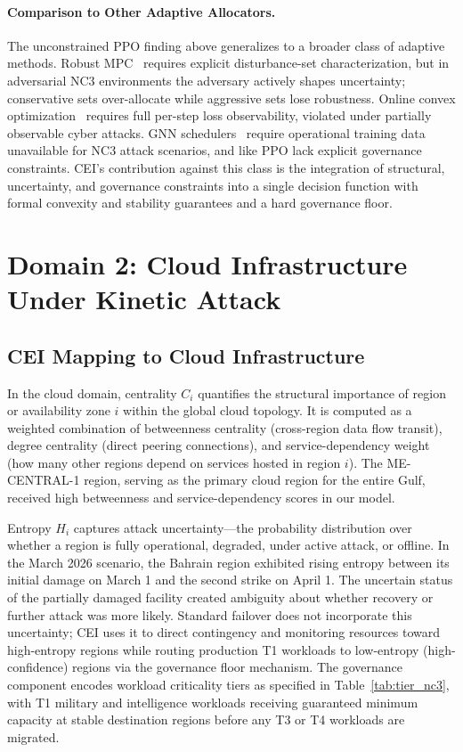 \documentclass[runningheads]{llncs}
\begin{document}
\paragraph{Comparison to Other Adaptive Allocators.} The unconstrained PPO finding above generalizes to a broader class of adaptive methods. Robust MPC~\cite{mayne} requires explicit disturbance-set characterization, but in adversarial NC3 environments the adversary actively shapes uncertainty; conservative sets over-allocate while aggressive sets lose robustness. Online convex optimization~\cite{hazan} requires full per-step loss observability, violated under partially observable cyber attacks. GNN schedulers~\cite{deng} require operational training data unavailable for NC3 attack scenarios, and like PPO lack explicit governance constraints. CEI's contribution against this class is the integration of structural, uncertainty, and governance constraints into a single decision function with formal convexity and stability guarantees and a hard governance floor.

\section{Domain 2: Cloud Infrastructure Under Kinetic Attack}
\label{sec:cloud}

\subsection{CEI Mapping to Cloud Infrastructure}

In the cloud domain, centrality $C_i$ quantifies the structural importance of region or availability zone $i$ within the global cloud topology. It is computed as a weighted combination of betweenness centrality (cross-region data flow transit), degree centrality (direct peering connections), and service-dependency weight (how many other regions depend on services hosted in region $i$). The ME-CENTRAL-1 region, serving as the primary cloud region for the entire Gulf, received high betweenness and service-dependency scores in our model.

Entropy $H_i$ captures attack uncertainty---the probability distribution over whether a region is fully operational, degraded, under active attack, or offline. In the March 2026 scenario, the Bahrain region exhibited rising entropy between its initial damage on March 1 and the second strike on April 1. The uncertain status of the partially damaged facility created ambiguity about whether recovery or further attack was more likely. Standard failover does not incorporate this uncertainty; CEI uses it to direct contingency and monitoring resources toward high-entropy regions while routing production T1 workloads to low-entropy (high-confidence) regions via the governance floor mechanism. The governance component encodes workload criticality tiers as specified in Table~\ref{tab:tier_nc3}, with T1 military and intelligence workloads receiving guaranteed minimum capacity at stable destination regions before any T3 or T4 workloads are migrated.
\end{document}
